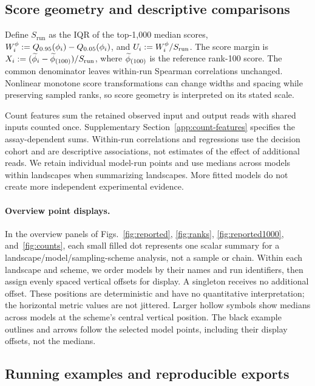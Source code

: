 \subsection{Score geometry and descriptive comparisons}

Define $S_{\mathrm{run}}$ as the IQR of the top-1,000 median
scores, $W_i^{\phi}:=Q_{0.95}(\phi_i)-Q_{0.05}(\phi_i)$,
and $U_i:=W_i^{\phi}/S_{\mathrm{run}}$. The score margin is
$X_i:=(\widetilde{\phi}_i-\widetilde{\phi}_{(100)})/S_{\mathrm{run}}$,
where $\widetilde{\phi}_{(100)}$ is the reference rank-100 score.
The common denominator leaves within-run Spearman correlations
unchanged. Nonlinear monotone score transformations can change
widths and spacing while preserving sampled ranks, so score
geometry is interpreted on its stated scale.

Count features sum the retained observed input and output reads
with shared inputs counted once. Supplementary
Section~\ref{app:count-features} specifies the assay-dependent
sums. Within-run correlations and regressions use the decision
cohort and are descriptive associations, not estimates of the
effect of additional reads. We retain individual model-run points
and use medians across models within landscapes when summarizing
landscapes. More fitted models do not create more independent
experimental evidence.

\paragraph{Overview point displays.}
In the overview panels of Figs.~\ref{fig:reported}, \ref{fig:ranks},
\ref{fig:reported1000}, and~\ref{fig:counts}, each small filled dot
represents one scalar summary for a landscape/model/sampling-scheme
analysis, not a sample or chain. Within each landscape and scheme,
we order models by their names and run identifiers, then assign evenly
spaced vertical offsets for display. A singleton receives no additional
offset. These positions are deterministic and have no quantitative
interpretation; the horizontal metric values are not jittered. Larger
hollow symbols show medians across models at the scheme's central
vertical position. The black example outlines and arrows follow the
selected model points, including their display offsets, not the medians.

\subsection{Running examples and reproducible exports}
\label{methods:examples}

